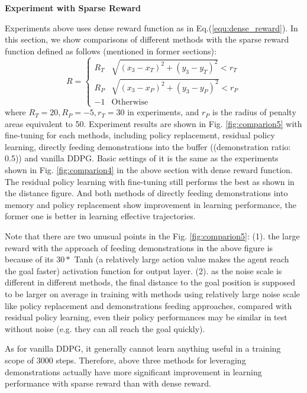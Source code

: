 \documentclass{article}
\begin{document}
\textbf{Experiment with Sparse Reward}

Experiments above uses dense reward function as in Eq.(\ref{equ:dense_reward}). In this section, we show comparisons of different methods with the sparse reward function defined as follows (mentioned in former sections):
\begin{equation}
    R =
\begin{cases}
R_T& \sqrt{(x_3-x_T)^2+(y_3-y_T)^2}<r_T\\
R_P& \sqrt{(x_3-x_P)^2+(y_3-y_P)^2}<r_P\\
-1& \text{Otherwise}
\end{cases}
\end{equation}
where $R_T=20, R_P=-5, r_T=30$ in experiments, and $r_P$ is the radius of penalty areas equivalent to 50.
Experiment results are shown in Fig. \ref{fig:comparion5} with fine-tuning for each methods, including policy replacement, residual policy learning, directly feeding demonstrations into the buffer ((demonstration ratio: 0.5)) and vanilla DDPG. Basic settings of it is the same as the experiments shown in Fig. \ref{fig:comparion4} in the above section with dense reward function. The residual policy learning with fine-tuning still performs the best as shown in the distance figure. And both methods of directly feeding demonstrations into memory and policy replacement show improvement in learning performance, the former one is better in learning effective trajectories. 

Note that there are two unusual points in the Fig. \ref{fig:comparion5}: (1). the large reward with the approach of feeding demonstrations in the above figure is because of its $30*$ Tanh (a relatively large action value makes the agent reach the goal faster) activation function for output layer. (2). as the noise scale is different in different methods, the final distance to the goal position is supposed to be larger on average in training with methods using relatively large noise scale like policy replacement and demonstrations feeding approaches, compared with residual policy learning, even their policy performances may be similar in test without noise (e.g. they can all reach the goal quickly). 

As for vanilla DDPG, it generally cannot learn anything useful in a training scope of 3000 steps. Therefore, above three methods for leveraging demonstrations actually have more significant improvement in learning performance with sparse reward than with dense reward.
\end{document}
